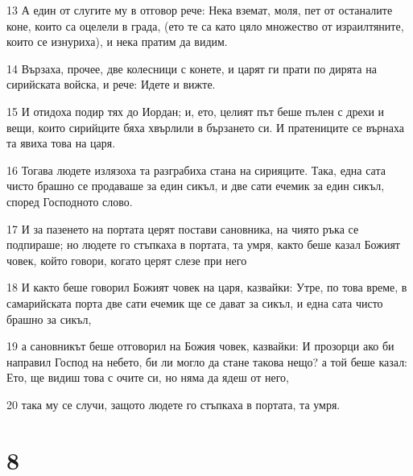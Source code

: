 \par 13 А един от слугите му в отговор рече: Нека вземат, моля, пет от останалите коне, които са оцелели в града, (ето те са като цяло множество от израилтяните, които се изнуриха), и нека пратим да видим.
\par 14 Вързаха, прочее, две колесници с конете, и царят ги прати по дирята на сирийската войска, и рече: Идете и вижте.
\par 15 И отидоха подир тях до Иордан; и, ето, целият път беше пълен с дрехи и вещи, които сирийците бяха хвърлили в бързането си. И пратениците се върнаха та явиха това на царя.
\par 16 Тогава людете излязоха та разграбиха стана на сирияците. Така, една сата чисто брашно се продаваше за един сикъл, и две сати ечемик за един сикъл, според Господното слово.
\par 17 И за пазенето на портата церят постави сановника, на чиято ръка се подпираше; но людете го стъпкаха в портата, та умря, както беше казал Божият човек, който говори, когато церят слезе при него
\par 18 И както беше говорил Божият човек на царя, казвайки: Утре, по това време, в самарийската порта две сати ечемик ще се дават за сикъл, и една сата чисто брашно за сикъл,
\par 19 а сановникът беше отговорил на Божия човек, казвайки: И прозорци ако би направил Господ на небето, би ли могло да стане такова нещо? а той беше казал: Ето, ще видиш това с очите си, но няма да ядеш от него,
\par 20 така му се случи, защото людете го стъпкаха в портата, та умря.

\chapter{8}

